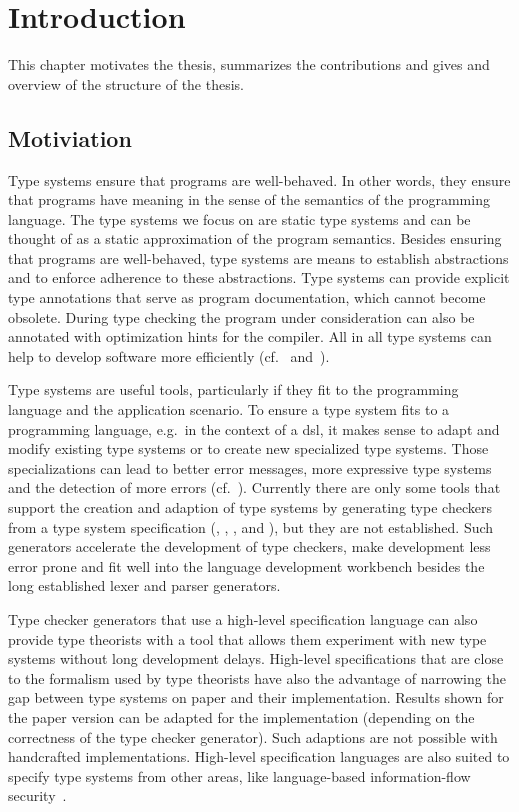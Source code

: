 \chapter{Introduction}
This chapter motivates the thesis, summarizes the contributions and
gives and overview of the structure of the thesis.

\section{Motiviation}
Type systems ensure that programs are well-behaved. In other words,
they ensure that programs have meaning in the sense of the semantics
of the programming language. The type systems we focus on are static
type systems and can be thought of as a static approximation of the
program semantics. Besides ensuring that programs are well-behaved,
type systems are means to establish abstractions and to enforce
adherence to these abstractions. Type systems can provide explicit
type annotations that serve as program documentation, which cannot
become obsolete. During type checking the program under consideration
can also be annotated with optimization hints for the compiler. All in
all type systems can help to develop software more efficiently
(cf.~\cite{Petersen:2014:ECS:2597008.2597152}
and~\cite{Mayer:2012:ESI:2384616.2384666}).

Type systems are useful tools, particularly if they fit to the
programming language and the application scenario. To ensure a type
system fits to a programming language, e.g.\ in the context of a
\gls{dsl}, it makes sense to adapt and modify existing type systems or
to create new specialized type systems. Those specializations can lead
to better error messages, more expressive type systems and the
detection of more errors
(cf.~\cite{Thiemann02programmabletype}). Currently there are only some
tools that support the creation and adaption of type systems by
generating type checkers from a type system specification
(\cite{Markstrum:2010:JDP:1667048.1667049}, \cite{ortin2014automatic},
\cite{gast2005generator}, \cite{tomb2005automatic} and
\cite{bergan2007typmix}), but they are not established. Such
generators accelerate the development of type checkers, make
development less error prone and fit well into the language
development workbench besides the long established lexer and parser
generators.

Type checker generators that use a high-level specification language
can also provide type theorists with a tool that allows them
experiment with new type systems without long development
delays. High-level specifications that are close to the formalism used
by type theorists have also the advantage of narrowing the gap between
type systems on paper and their implementation. Results shown for the
paper version can be adapted for the implementation (depending on the
correctness of the type checker generator). Such adaptions are not
possible with handcrafted implementations. High-level specification
languages are also suited to specify type systems from other areas,
like language-based information-flow
security~\cite{Sabelfeld:2006:LIS:2312191.2314769}.

